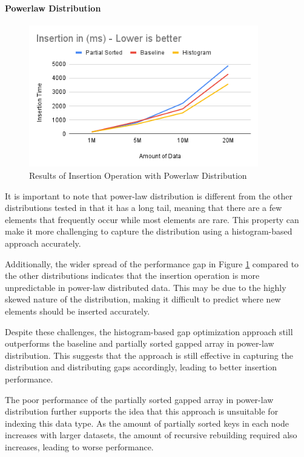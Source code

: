 \documentclass[11pt,a4paper]{article}
\begin{document}
\paragraph{Powerlaw Distribution}

\begin{figure}
    \centering
    \includegraphics[width=100mm,scale=1]{Figures/InsertionResultPowerlaw.png}
    \caption{
     Results of Insertion Operation with Powerlaw Distribution 
    }
    \label{fig:GraphInsertionResultPowerlaw}
\end{figure}
It is important to note that power-law distribution is different from the other distributions tested in that it has a long tail, meaning that there are a few elements that frequently occur while most elements are rare. This property can make it more challenging to capture the distribution using a histogram-based approach accurately.

Additionally, the wider spread of the performance gap in Figure \ref{fig:GraphInsertionResultPowerlaw} compared to the other distributions indicates that the insertion operation is more unpredictable in power-law distributed data. This may be due to the highly skewed nature of the distribution, making it difficult to predict where new elements should be inserted accurately.

Despite these challenges, the histogram-based gap optimization approach still outperforms the baseline and partially sorted gapped array in power-law distribution. This suggests that the approach is still effective in capturing the distribution and distributing gaps accordingly, leading to better insertion performance.

The poor performance of the partially sorted gapped array in power-law distribution further supports the idea that this approach is unsuitable for indexing this data type. As the amount of partially sorted keys in each node increases with larger datasets, the amount of recursive rebuilding required also increases, leading to worse performance.
\end{document}
